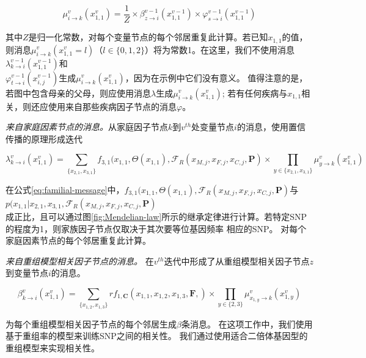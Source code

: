 \begin{equation}\label{eq:variable-message}
\mu_{i \rightarrow k}^v(x_{1,1}^v)= \frac{1}{Z} \times
\beta_{z \rightarrow i}^{v-1}(x_{1,1}^{v-1}) \times
\varphi_{s \rightarrow i}^{v-1}(x_{1,1}^{v-1})
\end{equation}

其中$Z$是归一化常数，对每个变量节点的每个邻居重复此计算。若已知$x_{1,1}$的值，则消息$\mu_{i \rightarrow k}^v(x_{1,1}^v =l)$（$l\in \{0,1,2\}$）将为常数1。在这里，我们不使用消息$\lambda_{k \rightarrow i}^{v-1}(x_{1,1}^{v-1})$和\\ $\varphi_{t \rightarrow i}^{v-1}(x_{i,j}^{v-1})$生成$\mu_{i \rightarrow k}^v(x_{1,1}^v)$，因为在示例中它们没有意义。 值得注意的是，若图中包含母亲的父母，则应使用消息$\lambda$生成$\mu_{i \rightarrow k}^v(x_{1,1}^v)$; 若有任何疾病与$x_{1,1}$相关，则还应使用来自那些疾病因子节点的消息$\varphi$。

\emph{来自家庭因素节点的消息。}从家庭因子节点$k$到$v^{th}$处变量节点$i$的消息，使用置信传播的原理形成迭代

\begin{equation}
\label{eq:familial-message}
\lambda_{k \rightarrow i}^v(x_{1,1}^v) =  \sum_{\{x_{2,1},x_{3,1}\}}f_{3,1}(x_{1,1},\Theta(x_{1,1}),\mathcal{F}_{R}(x_{M,j},x_{F,j}, x_{C,j},\mathbf{P}) 
\times \prod_{y\in \{x_{2,1},x_{3,1}\}} \mu_{y \rightarrow k}^v(x_{1,1}^v)
\end{equation}

在公式\ref{eq:familial-message}中，$f_{3,1}(x_{1,1},\Theta(x_{1,1}),\mathcal{F}_{R}(x_{M,j},x_{F,j}, x_{C,j},\mathbf{P})$与$p(x_{1,1}| x_{2,1},x_{3,1},\mathcal{F}_{R}(x_{M,j},x_{F,j}, x_{C,j},\mathbf{P})$\\成正比，且可以通过图\ref{fig:Mendelian-law}所示的继承定律进行计算。若特定SNP的程度为1，则家族因子节点仅取决于其次要等位基因频率 相应的SNP。 对每个家庭因素节点的每个邻居重复此计算。


\emph{来自重组模型相关因子节点的消息。} 在$v^{th}$迭代中形成了从重组模型相关因子节点$z$到变量节点$i$的消息。

\begin{equation}\label{eq:relavtes-information}
\beta_{k \rightarrow i}^v(x_{1,1}^v) = \sum_{\{x_{1,2},x_{1,3}\}}rf_{1,\mathbf{C}}(x_{1,1},x_{1,2},x_{1,3},\mathbf{F},) \times  \prod_{y \in \{2,3\}} \mu_{x_{1,y} \rightarrow k}^v(x_{1,y}^v)
\end{equation}

为每个重组模型相关因子节点的每个邻居生成$\beta$条消息。 在这项工作中，我们使用基于重组率的模型来训练SNP之间的相关性。 我们通过使用适合二倍体基因型\cite{marchini2007newa}的重组模型来实现相关性。

